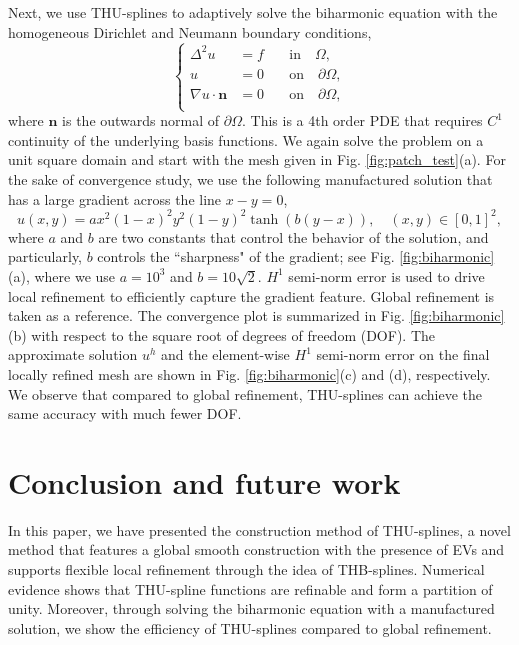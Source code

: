 \documentclass[graybox]{svmult}
\begin{document}
Next, we use THU-splines to adaptively solve the biharmonic equation with the homogeneous Dirichlet and Neumann boundary conditions,
\begin{equation}
\left\{
\begin{array}{rll}
\Delta^2 u &= f \quad &\text{in} \quad \Omega, \\
 u &= 0 \quad &\text{on} \quad \partial\Omega, \\
 \nabla u \cdot \bm{n} &= 0 \quad &\text{on} \quad \partial\Omega, \\
\end{array}
\right.
\end{equation}
where $\bm{n}$ is the outwards normal of $\partial\Omega$.
This is a 4th order PDE that requires $C^1$ continuity of the underlying basis functions. We again solve the problem on a unit square domain and start with the mesh given in Fig. \ref{fig:patch_test}(a). For the sake of convergence study, we use the following manufactured solution that has a large gradient across the line $x-y=0$,
\begin{equation}
u(x,y) = a x^2 (1-x)^2 y^2 (1-y)^2 \tanh (b (y-x)), \quad (x,y) \in [0,1]^2,
\end{equation}
where $a$ and $b$ are two constants that control the behavior of the solution, and particularly, $b$ controls the ``sharpness" of the gradient; see Fig. \ref{fig:biharmonic}(a), where we use $a=10^3$ and $b=10\sqrt{2}$. $H^1$ semi-norm error is used to drive local refinement to efficiently capture the gradient feature. Global refinement is taken as a reference. The convergence plot is summarized in Fig. \ref{fig:biharmonic}(b) with respect to the square root of degrees of freedom (DOF). The approximate solution $u^h$ and the element-wise $H^1$ semi-norm error on the final locally refined mesh are shown in Fig. \ref{fig:biharmonic}(c) and (d), respectively. We observe that compared to global refinement, THU-splines can achieve the same accuracy with much fewer DOF.

\section{Conclusion and future work}
\label{sec:conclude}

In this paper, we have presented the construction method of THU-splines, a novel method that features a global smooth construction with the presence of EVs and supports flexible local refinement through the idea of THB-splines. Numerical evidence shows that THU-spline functions are refinable and form a partition of unity. Moreover, through solving the biharmonic equation with a manufactured solution, we show the efficiency of THU-splines compared to global refinement.
\end{document}
